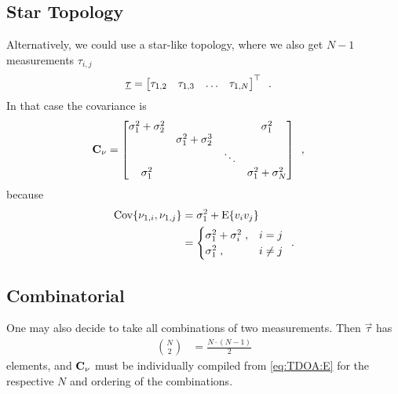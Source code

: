 \documentclass[conference]{IEEEtran}
\begin{document}
\subsection{Star Topology}
Alternatively, we could use a star-like topology, where we also get $N-1$ measurements $\tau_{i,j}$ 
\begin{align}
    \underline{\tau} &= \begin{bmatrix}\tau_{1,2}& \tau_{1,3}& \hdots& \tau_{1,N}\end{bmatrix}^\top \enspace. 
\end{align}
In that case the covariance is 
\begin{align}
    {\mathbf C}_\nu &= \begin{bmatrix}
        \sigma_1^2+\sigma_2^2 & & & \sigma_1^2 \\
         &  \sigma_1^2+\sigma_2^3 \\ 
         & & \ddots \\ 
         \sigma_1^2 & & & \sigma_1^2+\sigma_N^2
    \end{bmatrix} \enspace, 
\end{align}
because 
\begin{align}
    \Cov{\nu_{1,i}, \nu_{1,j}} 
    &= \sigma_1^2 + \E{v_i v_j} \\
    &= \begin{cases}
        \sigma_1^2 + \sigma_i^2 \;, & i=j \\ 
        \sigma_1^2 \;, & i \neq j
    \end{cases} \enspace. 
\end{align}

%
%
\subsection{Combinatorial}
One may also decide to take all combinations of two measurements. Then $\vec \tau$ has 
\begin{align}
    \binom{N}{2} &= \frac{N \cdot (N-1)}{2} 
\end{align}
elements, and ${\mathbf C}_\nu$ must be individually compiled from \cref{eq:TDOA:E} for the respective $N$ and ordering of the combinations. 


%
%
\end{document}
